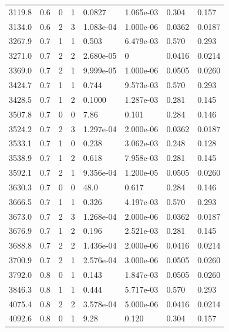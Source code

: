 \documentclass[preview]{standalone}
\begin{document}
{{{\begin{tabular}{L{1.2cm}C{1.2cm} C{0.3cm}C{0.5cm} C{1.4cm}C{1.4cm} C{1.4cm}C{1.4cm}}
  3119.8  &   0.6  & 0     &  1 &  0.0827  & 1.065e-03  & 0.304 &  0.157   \\ 
  3134.0  &   0.6  & 2     &  3 &  1.083e-04  & 1.000e-06  & 0.0362 &  0.0187   \\ 
  3267.9  &   0.7  & 1     &  1 &  0.503  & 6.479e-03  & 0.570 &  0.293   \\ 
  3271.0  &   0.7  & 2     &  2 &  2.680e-05  & 0  & 0.0416 &  0.0214   \\ 
  3369.0  &   0.7  & 2     &  1 &  9.999e-05  & 1.000e-06  & 0.0505 &  0.0260   \\ 
  3424.7  &   0.7  & 1     &  1 &  0.744  & 9.573e-03  & 0.570 &  0.293   \\ 
  3428.5  &   0.7  & 1     &  2 &  0.1000  & 1.287e-03  & 0.281 &  0.145   \\ 
  3507.8  &   0.7  & 0     &  0 &  7.86  & 0.101  & 0.284 &  0.146   \\ 
  3524.2  &   0.7  & 2     &  3 &  1.297e-04  & 2.000e-06  & 0.0362 &  0.0187   \\ 
  3533.1  &   0.7  & 1     &  0 &  0.238  & 3.062e-03  & 0.248 &  0.128   \\ 
  3538.9  &   0.7  & 1     &  2 &  0.618  & 7.958e-03  & 0.281 &  0.145   \\ 
  3592.1  &   0.7  & 2     &  1 &  9.356e-04  & 1.200e-05  & 0.0505 &  0.0260   \\ 
  3630.3  &   0.7  & 0     &  0 &  48.0  & 0.617  & 0.284 &  0.146   \\ 
  3666.5  &   0.7  & 1     &  1 &  0.326  & 4.197e-03  & 0.570 &  0.293   \\ 
  3673.0  &   0.7  & 2     &  3 &  1.268e-04  & 2.000e-06  & 0.0362 &  0.0187   \\ 
  3676.9  &   0.7  & 1     &  2 &  0.196  & 2.521e-03  & 0.281 &  0.145   \\ 
  3688.8  &   0.7  & 2     &  2 &  1.436e-04  & 2.000e-06  & 0.0416 &  0.0214   \\ 
  3700.9  &   0.7  & 2     &  1 &  2.576e-04  & 3.000e-06  & 0.0505 &  0.0260   \\ 
  3792.0  &   0.8  & 0     &  1 &  0.143  & 1.847e-03  & 0.0505 &  0.0260   \\ 
  3846.3  &   0.8  & 1     &  1 &  0.444  & 5.717e-03  & 0.570 &  0.293   \\ 
  4075.4  &   0.8  & 2     &  2 &  3.578e-04  & 5.000e-06  & 0.0416 &  0.0214   \\ 
  4092.6  &   0.8  & 0     &  1 &  9.28  & 0.120  & 0.304 &  0.157   \\ 

\end{tabular}}}}
\end{document}
